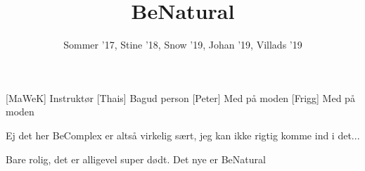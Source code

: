 \documentclass[a4paper,11pt]{article}
\title{BeNatural}
\author{Sommer '17, Stine '18, Snow '19, Johan '19, Villads '19}
\begin{document}
\maketitle

\begin{roles}
[MaWeK] Instruktør
[Thais] Bagud person
[Peter] Med på moden
[Frigg] Med på moden
\end{roles}

\begin{props}
\end{props}


\begin{sketch}

 Ej det her BeComplex er altså virkelig sært, jeg kan ikke rigtig komme ind i det...

 Bare rolig, det er alligevel super dødt. Det nye er BeNatural


\end{sketch}
\end{document}
